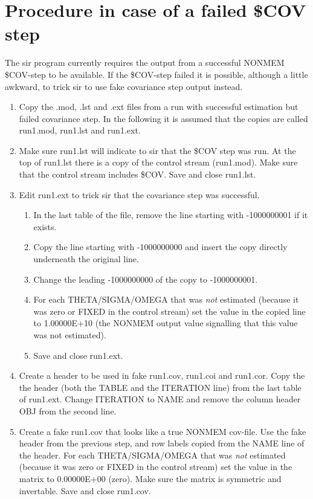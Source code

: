 \section{Procedure in case of a failed \$COV step}
The sir program currently requires the output from a successful NONMEM \$COV-step to be available. If the \$COV-step failed it is possible, although a little awkward, to trick sir to use fake covariance step output instead.
\begin{enumerate}
\item Copy the .mod, .lst and .ext files from a run with successful estimation but failed covariance step. In the following it is assumed that the copies are called run1.mod, run1.lst and run1.ext.
\item Make sure run1.lst will indicate to sir that the \$COV step was run. At the top of run1.lst there is a copy of the control stream (run1.mod). Make sure that the control stream includes \$COV. Save and close run1.lst.
\item Edit run1.ext to trick sir that the covariance step was successful. 
\begin{enumerate}
\item In the last table of the file, remove the line starting with -1000000001 if it exists. 
\item Copy the line starting with -1000000000 and insert the copy directly underneath the original line. 
\item Change the leading -1000000000 of the copy to -1000000001. 
\item For each THETA/SIGMA/OMEGA that was \emph{not} estimated (because it was zero or FIXED in the control stream) set the value in the copied line to 1.00000E+10 (the NONMEM output value signalling that this value was not estimated).
\item Save and close run1.ext.
\end{enumerate}
\item Create a header to be used in fake run1.cov, run1.coi and run1.cor. Copy the the header (both the TABLE and the ITERATION line) from the last table of run1.ext. Change ITERATION to NAME and remove the column header OBJ from the second line.
\item Create a fake run1.cov that looks like a true NONMEM cov-file. Use the fake header from the previous step, and row labels copied from the NAME line of the header. For each THETA/SIGMA/OMEGA that was \emph{not} estimated (because it was zero or FIXED in the control stream) set the value in the matrix to 0.00000E+00 (zero). Make sure the matrix is symmetric and invertable. Save and close run1.cov.

\end{enumerate}
